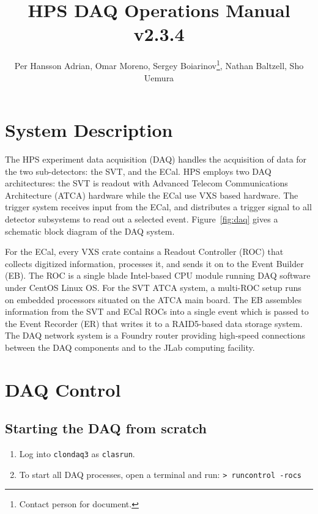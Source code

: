 \documentclass[12pt]{article}
\title{HPS DAQ Operations Manual v2.3.4}
\author{Per Hansson Adrian, Omar Moreno, Sergey Boiarinov\thanks{Contact person for document.}, Nathan Baltzell, Sho Uemura }
\begin{document}
\maketitle

\tableofcontents

\section{System Description}
The HPS experiment data acquisition (DAQ) handles the acquisition of data for the two sub-detectors: the SVT,  and the ECal. HPS employs two DAQ architectures: the SVT is readout with Advanced Telecom Communications Architecture (ATCA) hardware while the ECal use VXS based hardware. The trigger system receives input from the ECal, and distributes a trigger signal to all detector subsystems to read out a selected event. Figure~\ref{fig:daq} gives a schematic block diagram of the DAQ system.

For the ECal, every VXS crate contains a Readout Controller (ROC) that collects digitized information, processes it, and sends it on to the Event Builder (EB). The ROC is a single blade Intel-based CPU module running DAQ software under CentOS Linux OS. For the SVT ATCA system, a multi-ROC setup runs on embedded processors situated on the ATCA main board. The EB assembles information from the SVT and ECal ROCs into a single event which is passed to the Event Recorder (ER) that writes it to a RAID5-based data storage system. The DAQ network system is a Foundry router providing high-speed connections between the DAQ components and to the JLab computing facility. 

\newpage
\section{DAQ Control}
\label{sec:daq_control}

\subsection{Starting the DAQ from scratch}\label{sec:daqstart}

\begin{enumerate}
\item 
Log into \texttt{clondaq3} as \texttt{clasrun}.
\item 
To start all DAQ processes, open a terminal and run:\newline
\texttt{> runcontrol -rocs}\newline
\end{enumerate}
\end{document}
